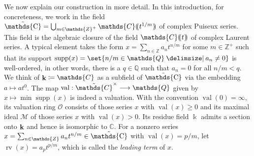 \documentclass[12pt]{amsart}
\newcommand{\memph}[1]{{\color{magenta}\emph{#1}}}
\theoremstyle{plain}
\theoremstyle{definition}
\theoremstyle{remark}
\numberwithin{equation}{section}
\theoremstyle{plain}
\newcommand{\MM}{\mdl M}
\newcommand{\OO}{\mdl O}
\DeclareMathOperator{\supp}{supp}
\DeclareMathOperator{\K}{\mathds{k}}
\newcommand{\Z}{\mathds{Z}}
\newcommand{\C}{\mathds{C}}
\newcommand{\Q}{\mathds{Q}}
\newcommand{\0}{\emptyset}
\newcommand{\dpar}[1]{%
   (\mkern-4mu (#1 )\mkern-4mu )}
\newcommand{\mdl}[1]{\mathcal{#1}}  %
\newcommand{\fun}{\longrightarrow}
\newcommand{\efun}{\longmapsto}
\newcommand{\mi}{\smallsetminus}
\providecommand\given{}
\newcommand\SetSymbol[1][]{%
\nonscript \: #1 \vert
\allowbreak
\nonscript\:
\mathopen{}}
\renewcommand\given{\SetSymbol[\delimsize]}
\DeclareMathOperator{\rv}{rv}
\DeclareMathOperator{\vv}{val}
\DeclareMathOperator{\gsk}{\mathbf{K}_+}
\DeclareMathOperator{\ggk}{\mathbf{K}}
\DeclareMathOperator{\bfk}{\bf k}
\DeclareMathOperator{\puC}{\tilde \C}
\begin{document}
We now explain our construction in more detail.
In this introduction, for concreteness, we work in  the field $\puC = \bigcup_{m \in \Z^+} \C \dpar{ t^{1 / m} }$ of complex Puiseux series. This field is the algebraic closure of the field $\C \dpar t$ of complex Laurent series. A typical element  takes the form $x = \sum_{n \in \Z} a_n t^{n/m}$ for some $m \in \Z^+$ such that its support $\supp(x) = \set{n/m \in \Q \given a_n \neq 0 }$ is well-ordered, in other words, there is a $q \in \Q$ such that $a_n = 0$ for all $n/m < q$. We think of $\bfk \coloneqq \C$ as a subfield of $\puC$ via the embedding $a \efun at^0$. The map $\vv: \tilde \C^\times \fun \Q$ given by $x \efun \min\supp(x)$ is indeed a valuation. With the convention $\vv(0) = \infty$, its valuation ring $\OO$ consists of those series $x$ with $\vv(x) \geq 0$ and its maximal ideal $\MM$ of those series $x$ with $\vv(x) > 0$. Its residue field $\K$ admits a section onto $\bfk$ and hence is isomorphic to $\C$. For a nonzero series $x = \sum_{n \in \Z} a_n t^{n/m} \in \puC$ with $\vv(x) = p/m$, let $\rv(x) = a_p t^{p/m}$, which is called the \memph{leading term} of $x$.
\end{document}
